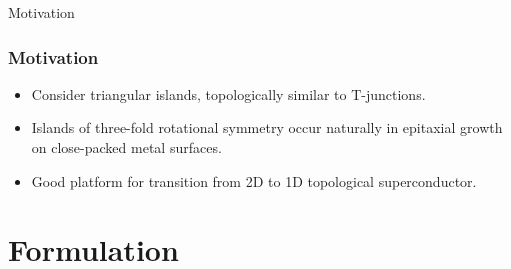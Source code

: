 \documentclass[xcolor=dvipsnames,10pt,aspectratio=169]{beamer}
\newcommand{\MO}{Motivation}
\newcommand{\FO}{Formulation}
\begin{document}
\begin{frame}{\MO}{}
  \end{frame}

  \begin{frame}
    \frametitle{\MO}
    \begin{multicols}{2}

    \begin{itemize}
      \item Consider triangular islands, topologically similar to T-junctions.
      \item Islands of three-fold rotational symmetry occur naturally in epitaxial growth on close-packed metal surfaces.
      \item Good platform for transition from 2D to 1D topological superconductor.
    \end{itemize}
    \newline

    \begin{figure}
      \end{figure}
    \end{multicols}

  \end{frame}


  \section{\FO}
\end{document}
